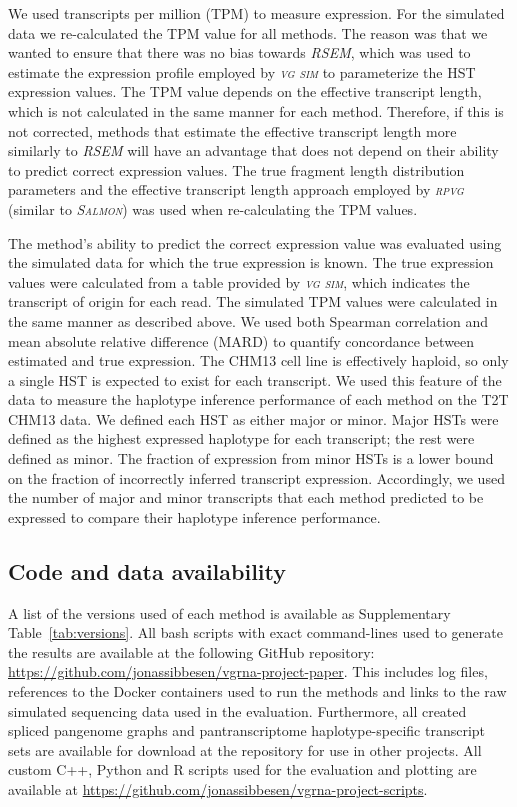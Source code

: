\documentclass[11pt]{ucthesis}
\newcommand{\tool}[1]{\emph{\textsc{#1}}}
\begin{document}
We used transcripts per million (TPM) to measure expression. For the simulated data we re-calculated the TPM value for all methods. The reason was that we wanted to ensure that there was no bias towards \tool{RSEM}, which was used to estimate the expression profile employed by \tool{vg sim} to parameterize the HST expression values. The TPM value depends on the effective transcript length, which is not calculated in the same manner for each method. Therefore, if this is not corrected, methods that estimate the effective transcript length more similarly to \tool{RSEM} will have an advantage that does not depend on their ability to predict correct expression values. The true fragment length distribution parameters and the effective transcript length approach employed by \tool{rpvg} (similar to \tool{Salmon}) was used when re-calculating the TPM values.

The method's ability to predict the correct expression value was evaluated using the simulated data for which the true expression is known. The true expression values were calculated from a table provided by \tool{vg sim}, which indicates the transcript of origin for each read. The simulated TPM values were calculated in the same manner as described above. We used both Spearman correlation and mean absolute relative difference (MARD) to quantify concordance between estimated and true expression. 
\newline 
\newline
The CHM13 cell line is effectively haploid, so only a single HST is expected to exist for each transcript. We used this feature of the data to measure the haplotype inference performance of each method on the T2T CHM13 data. We defined each HST as either major or minor. Major HSTs were defined as the highest expressed haplotype for each transcript; the rest were defined as minor. The fraction of expression from minor HSTs is a lower bound on the fraction of incorrectly inferred transcript expression. Accordingly, we used the number of major and minor transcripts that each method predicted to be expressed to compare their haplotype inference performance.

\subsection{Code and data availability}

A list of the versions used of each method is available as Supplementary Table~\ref{tab:versions}. All bash scripts with exact command-lines used to generate the results are available at the following GitHub repository: \url{https://github.com/jonassibbesen/vgrna-project-paper}. This includes log files, references to the Docker containers used to run the methods and links to the raw simulated sequencing data used in the evaluation. Furthermore, all created spliced pangenome graphs and pantranscriptome haplotype-specific transcript sets are available for download at the repository for use in other projects. All custom C++, Python and R scripts used for the evaluation and plotting are available at \url{https://github.com/jonassibbesen/vgrna-project-scripts}. 
\end{document}

